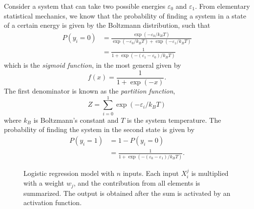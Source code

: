 Consider a system that can take two possible energies $\varepsilon_0$ and $\varepsilon_1$. From elementary statistical mechanics, we know that the probability of finding a system in a state of a certain energy is given by the Boltzmann distribution, such that
\begin{align}
P(y_i=0)&=\frac{\exp(-\varepsilon_0/k_BT)}{\exp(-\varepsilon_0/k_BT)+\exp(-\varepsilon_1/k_BT)}\\
&=\frac{1}{1+\exp(-(\varepsilon_1-\varepsilon_0)/k_BT)}
\end{align}
which is the \textit{sigmoid function}, in the most general given by
\begin{equation}
f(x)=\frac{1}{1+\exp(-x)}.
\end{equation}
The first denominator is known as the \textit{partition function},
\begin{equation}
Z=\sum_{i=0}^1\exp(-\varepsilon_i/k_BT)
\label{eq:partition}
\end{equation}
where $k_B$ is Boltzmann's constant and $T$ is the system temperature. The probability of finding the system in the second state is given by
\begin{align}
P(y_i=1)&=1-P(y_i=0)\\
&=\frac{1}{1+\exp(-(\varepsilon_0-\varepsilon_1)/k_BT)}.
\end{align}

\begin{figure}
	\centering
	
	\caption{Logistic regression model with $n$ inputs. Each input $X_i^j$ is multiplied with a weight $w_j$, and the contribution from all elements is summarized. The output is obtained after the sum is activated by an activation function.}
	\label{fig:single_perceptron}
\end{figure}

